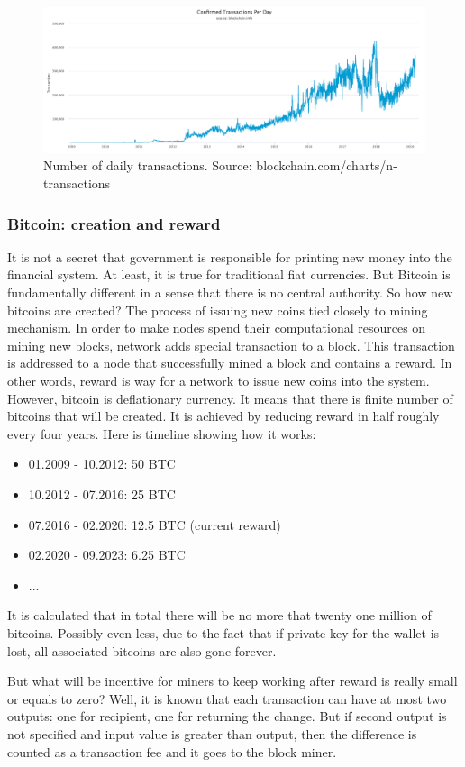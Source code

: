 \documentclass[conference,compsoc]{IEEEtran}
\begin{document}
\begin{figure}[h!]
  \centering
  \includegraphics[width=.45\textwidth]{graphics/confirmed_tx.png}
  \caption[Caption]{Number of daily transactions. Source: blockchain.com/charts/n-transactions}
  \label{fig:fig8}
\end{figure}

\subsubsection{Bitcoin: creation and reward}
It is not a secret that government is responsible for printing new money into the financial system. 
At least, it is true for traditional fiat currencies.
But Bitcoin is fundamentally different in a sense that there is no central authority.
So how new bitcoins are created?
The process of issuing new coins tied closely to mining mechanism. 
In order to make nodes spend their computational resources on mining new blocks, network adds special transaction to a block. 
This transaction is addressed to a node that successfully mined a block and contains a reward. 
In other words, reward is way for a network to issue new coins into the system. 
However, bitcoin is deflationary currency. 
It means that there is finite number of bitcoins that will be created. 
It is achieved by reducing reward in half roughly every four years. 
Here is timeline showing how it works:

\begin{itemize}
    \item 01.2009 - 10.2012: 50 BTC
    \item 10.2012 - 07.2016: 25 BTC
    \item 07.2016 - 02.2020: 12.5 BTC (current reward)
    \item 02.2020 - 09.2023: 6.25 BTC
    \item ...
\end{itemize}

It is calculated that in total there will be no more that twenty one million of bitcoins. 
Possibly even less, due to the fact that if private key for the wallet is lost, all associated bitcoins are also gone forever. 

But what will be incentive for miners to keep working after reward is really small or equals to zero? 
Well, it is known that each transaction can have at most two outputs: one for recipient, one for returning the change. 
But if second output is not specified and input value is greater than output, then the difference is counted as a transaction fee and it goes to the block miner.
\end{document}
